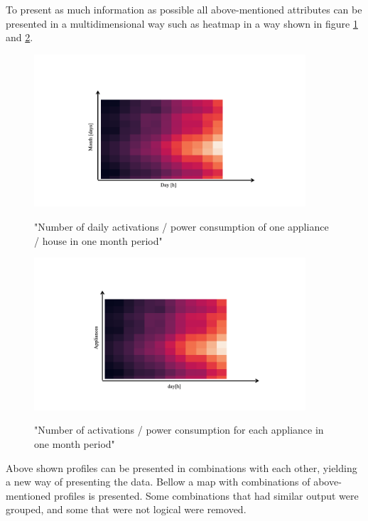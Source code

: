 To present as much information as possible all above-mentioned attributes 
can be presented in a multidimensional way such as heatmap in a way shown in figure \ref{fig:heatmap_2dtime} and \ref{fig:heatmap_all_appl}.

\begin{figure}[H]
	\centering
	\caption{"Number of daily activations / power consumption of one appliance / house in one month period"}
	\includegraphics[width=0.9\textwidth]{Figures/profile_sketches/Slide10.png}
	\label{fig:heatmap_2dtime}
\end{figure}
\begin{figure}[H]
	\centering
	\caption{"Number of activations / power consumption for each appliance in one month period"}
	\includegraphics[width=0.9\textwidth]{Figures/profile_sketches/Slide12.png}
	\label{fig:heatmap_all_appl}
\end{figure}

Above shown profiles can be presented in combinations with each other, yielding a new way of presenting the data.
Bellow a map with combinations of above-mentioned profiles is presented. Some combinations that had similar output were grouped,
and some that were not logical were removed.  

